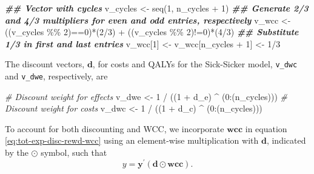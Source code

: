 \documentclass[
]{article}
\newenvironment{Shaded}{\begin{snugshade}}{\end{snugshade}}
\newcommand{\CommentTok}[1]{\textcolor[rgb]{0.56,0.35,0.01}{\textit{#1}}}
\newcommand{\DecValTok}[1]{\textcolor[rgb]{0.00,0.00,0.81}{#1}}
\newcommand{\DocumentationTok}[1]{\textcolor[rgb]{0.56,0.35,0.01}{\textbf{\textit{#1}}}}
\newcommand{\FunctionTok}[1]{\textcolor[rgb]{0.00,0.00,0.00}{#1}}
\newcommand{\NormalTok}[1]{#1}
\newcommand{\OtherTok}[1]{\textcolor[rgb]{0.56,0.35,0.01}{#1}}
\newcommand{\SpecialCharTok}[1]{\textcolor[rgb]{0.00,0.00,0.00}{#1}}
\begin{document}
\begin{Shaded}
\begin{Highlighting}[]
\DocumentationTok{\#\# Vector with cycles}
\NormalTok{v\_cycles }\OtherTok{\textless{}{-}} \FunctionTok{seq}\NormalTok{(}\DecValTok{1}\NormalTok{, n\_cycles }\SpecialCharTok{+} \DecValTok{1}\NormalTok{)}
\DocumentationTok{\#\# Generate 2/3 and 4/3 multipliers for even and odd entries, respectively}
\NormalTok{v\_wcc }\OtherTok{\textless{}{-}}\NormalTok{ ((v\_cycles }\SpecialCharTok{\%\%} \DecValTok{2}\NormalTok{)}\SpecialCharTok{==}\DecValTok{0}\NormalTok{)}\SpecialCharTok{*}\NormalTok{(}\DecValTok{2}\SpecialCharTok{/}\DecValTok{3}\NormalTok{) }\SpecialCharTok{+}\NormalTok{ ((v\_cycles }\SpecialCharTok{\%\%} \DecValTok{2}\NormalTok{)}\SpecialCharTok{!=}\DecValTok{0}\NormalTok{)}\SpecialCharTok{*}\NormalTok{(}\DecValTok{4}\SpecialCharTok{/}\DecValTok{3}\NormalTok{)}
\DocumentationTok{\#\# Substitute 1/3 in first and last entries}
\NormalTok{v\_wcc[}\DecValTok{1}\NormalTok{] }\OtherTok{\textless{}{-}}\NormalTok{ v\_wcc[n\_cycles }\SpecialCharTok{+} \DecValTok{1}\NormalTok{] }\OtherTok{\textless{}{-}} \DecValTok{1}\SpecialCharTok{/}\DecValTok{3}
\end{Highlighting}
\end{Shaded}

The discount vectors, \(\mathbf{d}\), for costs and QALYs for the Sick-Sicker model, \texttt{v\_dwc} and \texttt{v\_dwe}, respectively, are

\begin{Shaded}
\begin{Highlighting}[]
\CommentTok{\# Discount weight for effects}
\NormalTok{v\_dwe }\OtherTok{\textless{}{-}} \DecValTok{1} \SpecialCharTok{/}\NormalTok{ ((}\DecValTok{1} \SpecialCharTok{+}\NormalTok{ d\_e) }\SpecialCharTok{\^{}}\NormalTok{ (}\DecValTok{0}\SpecialCharTok{:}\NormalTok{(n\_cycles)))  }
\CommentTok{\# Discount weight for costs }
\NormalTok{v\_dwc }\OtherTok{\textless{}{-}} \DecValTok{1} \SpecialCharTok{/}\NormalTok{ ((}\DecValTok{1} \SpecialCharTok{+}\NormalTok{ d\_c) }\SpecialCharTok{\^{}}\NormalTok{ (}\DecValTok{0}\SpecialCharTok{:}\NormalTok{(n\_cycles)))    }
\end{Highlighting}
\end{Shaded}

To account for both discounting and WCC, we incorporate \(\mathbf{wcc}\) in equation \eqref{eq:tot-exp-disc-rewd-wcc} using an element-wise multiplication with \(\mathbf{d}\), indicated by the \(\odot\) symbol, such that
\begin{equation}
 y = \mathbf{y}^{'} \left(\mathbf{d} \odot \mathbf{wcc}\right).
 \label{eq:tot-exp-disc-rewd-wcc}
\end{equation}
\end{document}
